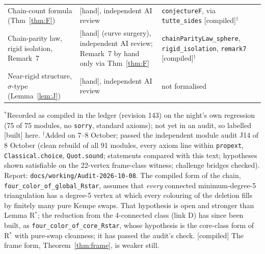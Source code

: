 \documentclass[11pt]{article}
\newcommand{\lab}[1]{\textsf{[#1]}}
\begin{document}
\begin{center}
\begin{tabular}{p{3.6cm}p{4.3cm}p{6.1cm}}
Chain-count formula (Thm~\ref{thm:F}) & \lab{hand}, independent AI review & \texttt{conjectureF}, via \texttt{tutte\_sides} \lab{compiled}$^\dagger$\\
Chain-parity law, rigid isolation, Remark~7 & \lab{hand} (curve surgery), independent AI review; Remark~7 by hand only via Thm~\ref{thm:F} & \texttt{chainParityLaw\_sphere}, \texttt{rigid\_isolation}, \texttt{remark7} \lab{compiled}$^\dagger$\\
Near-rigid structure, $\sigma$-type (Lemma~\ref{lem:J}) & \lab{hand}, independent AI review & not formalised\\
\end{tabular}
\end{center}
$^\ast$Recorded as compiled in the ledger (revision 143) on the night's own regression (75 of 75 modules, no \texttt{sorry}, standard axioms); not yet in an audit, so labelled \lab{built} here.
$^\dagger$Added on 7--8 October; passed the independent module audit J14 of 8 October (clean rebuild of all 91 modules, every axiom line within \texttt{propext}, \texttt{Classical.choice}, \texttt{Quot.sound}; statements compared with this text; hypotheses shown satisfiable on the 22-vertex frame-class witness; challenge bridges checked). Report: \texttt{docs/working/Audit-2026-10-08}.
The compiled form of the chain, \texttt{four\_color\_of\_global\_Rstar}, assumes that \emph{every} connected minimum-degree-5 triangulation has a degree-5 vertex at which every colouring of the deletion fills by finitely many pure Kempe swaps. That hypothesis is open and stronger than Lemma R$^\ast$; the reduction from the 4-connected class (link D) has since been built, as \texttt{four\_color\_of\_core\_Rstar}, whose hypothesis is the core-class form of R$^\ast$ with pure-swap cleanness; it has passed the audit's check. \lab{compiled} The frame form, Theorem~\ref{thm:frame}, is weaker still.
\end{document}
